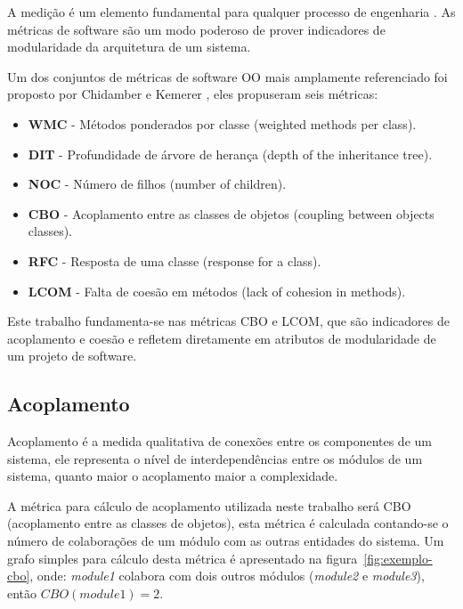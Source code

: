 A medição é um elemento fundamental para qualquer processo de engenharia
\cite{engenhariaDeSoftwarePressman}. As métricas de software são um modo
poderoso de prover indicadores de modularidade da arquitetura de um
sistema\cite{OntheModular}. 

Um dos conjuntos de métricas de software OO
mais amplamente referenciado foi proposto por Chidamber e Kemerer
\cite{engenhariaDeSoftwarePressman}, eles propuseram seis métricas:

\begin{itemize}

\item {\bf WMC} -
Métodos ponderados por classe (weighted methods per class).

\item {\bf DIT} -
Profundidade de árvore de herança (depth of the inheritance tree).

\item {\bf NOC} -
Número de filhos (number of children).

\item {\bf CBO} -
Acoplamento entre as classes de objetos (coupling between objects classes).

\item {\bf RFC} -
Resposta de uma classe (response for a class).

\item {\bf LCOM} -
Falta de coesão em métodos (lack of cohesion in methods).

\end{itemize}

Este trabalho fundamenta-se nas métricas CBO e LCOM, que são indicadores de
acoplamento e coesão e refletem diretamente em atributos de modularidade de um
projeto de software.

\subsection{Acoplamento}

Acoplamento é a medida qualitativa de conexões entre os componentes de um
sistema, ele representa o nível de interdependências entre os módulos de um
sistema, quanto maior o acoplamento maior a complexidade.

A métrica para cálculo de acoplamento utilizada neste trabalho será CBO
(acoplamento entre as classes de objetos), esta métrica é calculada contando-se
o número de colaborações de um módulo com as outras entidades do sistema.  Um
grafo simples para cálculo desta métrica é apresentado na
figura~\ref{fig:exemplo-cbo}, onde: {\it module1} colabora com dois outros
módulos ({\it module2} e {\it module3}), então $CBO(module1) = 2$.

